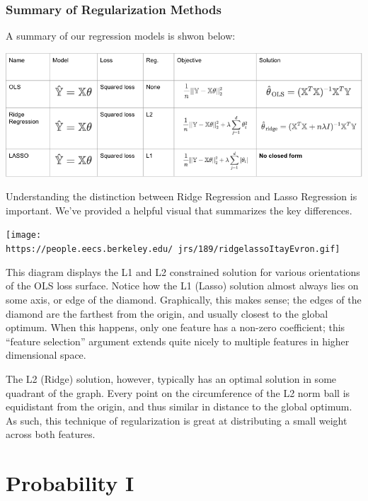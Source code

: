 \documentclass[
  letterpaper,
  DIV=11,
  numbers=noendperiod]{scrreprt}
\begin{document}
\hypertarget{summary-of-regularization-methods}{%
\subsection{Summary of Regularization
Methods}\label{summary-of-regularization-methods}}

A summary of our regression models is shwon below:

\includegraphics{cv_regularization/images/reg_models_sum.png}

Understanding the distinction between Ridge Regression and Lasso
Regression is important. We've provided a helpful visual that summarizes
the key differences.

\texttt{[image: https://people.eecs.berkeley.edu/~jrs/189/ridgelassoItayEvron.gif]}

This diagram displays the L1 and L2 constrained solution for various
orientations of the OLS loss surface. Notice how the L1 (Lasso) solution
almost always lies on some axis, or edge of the diamond. Graphically,
this makes sense; the edges of the diamond are the farthest from the
origin, and usually closest to the global optimum. When this happens,
only one feature has a non-zero coefficient; this ``feature selection''
argument extends quite nicely to multiple features in higher dimensional
space.

The L2 (Ridge) solution, however, typically has an optimal solution in
some quadrant of the graph. Every point on the circumference of the L2
norm ball is equidistant from the origin, and thus similar in distance
to the global optimum. As such, this technique of regularization is
great at distributing a small weight across both features.


\hypertarget{probability-i}{%
\chapter{Probability I}\label{probability-i}}
\end{document}
